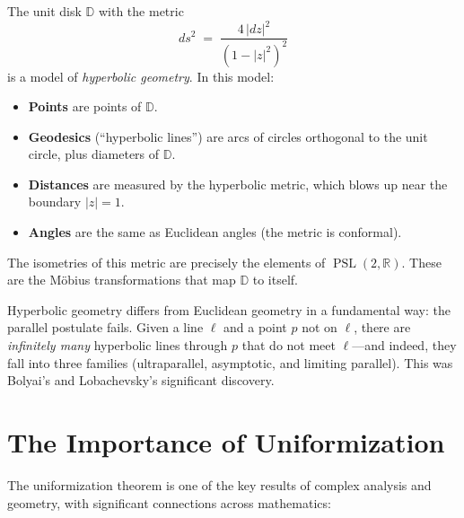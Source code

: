The unit disk $\mathbb{D}$ with the metric
\[
    ds^2 \;=\; \frac{4\,|dz|^2}{(1 - |z|^2)^2}
\]
is a model of \emph{hyperbolic geometry}. In this model:

\begin{itemize}
    \item \textbf{Points} are points of $\mathbb{D}$.
    \item \textbf{Geodesics} (``hyperbolic lines'') are arcs of circles orthogonal to the unit circle, plus diameters of $\mathbb{D}$.
    \item \textbf{Distances} are measured by the hyperbolic metric, which blows up near the boundary $|z|=1$.
    \item \textbf{Angles} are the same as Euclidean angles (the metric is conformal).
\end{itemize}

The isometries of this metric are precisely the elements of $\operatorname{PSL}(2,\mathbb{R})$. These are the M\"obius transformations that map $\mathbb{D}$ to itself.

\begin{remark}
Hyperbolic geometry differs from Euclidean geometry in a fundamental way: the parallel postulate fails. Given a line $\ell$ and a point $p$ not on $\ell$, there are \emph{infinitely many} hyperbolic lines through $p$ that do not meet $\ell$---and indeed, they fall into three families (ultraparallel, asymptotic, and limiting parallel). This was Bolyai's and Lobachevsky's significant discovery.
\end{remark}

\section{The Importance of Uniformization}

The uniformization theorem is one of the key results of complex analysis and geometry, with significant connections across mathematics:

